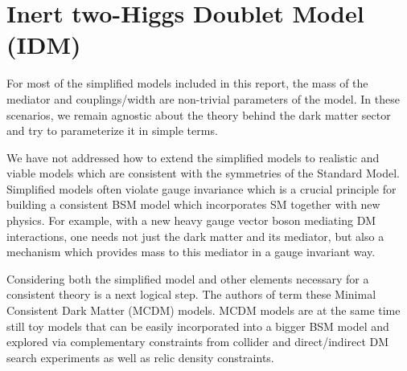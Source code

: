 \section{Inert two-Higgs Doublet Model (IDM)}\label{sec:i2HDM}

For most of the simplified models included in this report, the mass of
the mediator and couplings/width are non-trivial parameters of the
model. In these scenarios, we remain agnostic about the theory behind
the dark matter sector and try to parameterize it in simple terms.

We have not addressed how to extend the simplified models to realistic
and viable models which are consistent with the symmetries of the
Standard Model. Simplified models often violate gauge invariance which
is a crucial principle for building a consistent BSM model which
incorporates SM together with new physics. For example, with a new
heavy gauge vector boson mediating DM interactions, one needs not just
the dark matter and its mediator, but also a mechanism which provides
mass to this mediator in a gauge invariant way.

Considering both the simplified model and other elements necessary for a consistent theory is a next logical step. The authors of \cite{Belyaev:2015tap} term these Minimal
Consistent Dark Matter (MCDM) models. MCDM models are at the same time still toy models that can be 
easily incorporated into a bigger BSM model and explored via
complementary constraints from collider and direct/indirect DM search
experiments as well as relic density constraints. 




